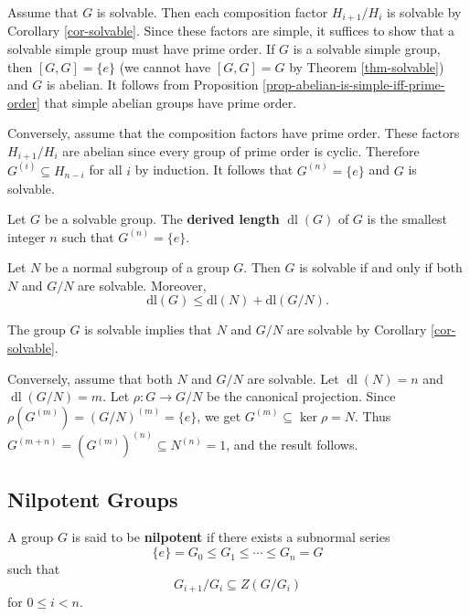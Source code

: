 \begin{sketch}
	Assume that $G$ is solvable. Then each composition factor $H_{i+1}/H_i$ is solvable by Corollary \ref{cor-solvable}. Since these factors are simple, it suffices to show that a solvable simple group must have prime order. If $G$ is a solvable simple group, then $[G,G] =\{e\}$ (we cannot have $[G,G] = G$ by Theorem \ref{thm-solvable}) and $G$ is abelian. It follows from Proposition \ref{prop-abelian-is-simple-iff-prime-order} that simple abelian groups have prime order. 
	
	
Conversely, assume that the composition factors have prime order. These factors $H_{i+1}/H_i$ are abelian since every group of prime order is cyclic.  Therefore $G^{(i)} \subseteq H_{n-i}$ for all $i$ by induction.  It follows that $G^{(n)} = \{e\}$ and $G$ is solvable.
\end{sketch} 
\begin{definition}
	Let $G$ be a  solvable group. The \textbf{derived length} $\operatorname{dl}(G)$ of $G$ is the smallest integer $n$ such that $G^{(n)} = \{e\}$.
\end{definition}
\begin{corollary}
	Let $N$ be a normal subgroup of  a group $G$. Then $G$ is solvable if and only if both $N$ and $G/N$ are solvable. Moreover, $$\text{dl}(G) \leq \text{dl}(N) + \text{dl}(G/N).$$
\end{corollary}
\begin{sketch}
	 The group $G$ is solvable implies that $N$ and $G/N$ are solvable by Corollary \ref{cor-solvable}.
	 
	 Conversely, assume that both $N$ and $G/N$ are solvable. Let $\operatorname{dl}(N) = n$ and $\operatorname{dl}(G/N) = m$. Let  $\rho:G \rightarrow G/N$ be the canonical projection. Since $\rho(G^{(m)}) = (G/N)^{(m)} = \{e\}$, we get $G^{(m)} \subseteq \ker \rho = N$. Thus $G^{(m+n)} = (G^{(m)})^{(n)} \subseteq N^{(n)} = 1$, and the result follows.
\end{sketch}





\subsection{Nilpotent Groups}
\begin{definition}
	A group $G$ is said to be \textbf{nilpotent} if there exists a subnormal series
	\begin{equation*}
		\{e\} = G_0 \leq G_1 \leq \cdots \leq G_n = G
	\end{equation*}
	such that
	\begin{equation*}
		G_{i+1}/G_{i} \subseteq Z(G/G_{i})
	\end{equation*}
	for $0\leq i<n$.
\end{definition}

